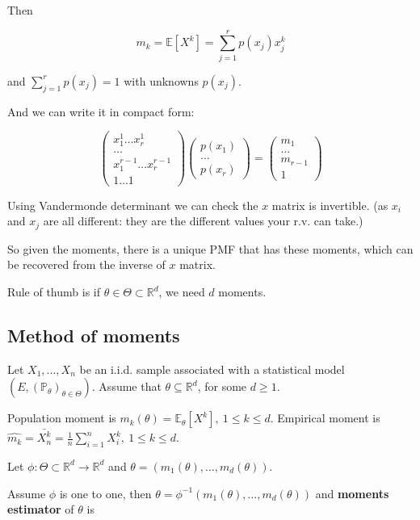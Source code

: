 \documentclass{article}
\begin{document}
Then

$$
m_k = \mathbb{E}[X^k] = \sum_{j = 1}^{r} {p(x_j) x_j^k}
$$

and $\sum_{j = 1}^{r} p(x_j) = 1$ with unknowns $p(x_j)$.

And we can write it in compact form:

$$
\begin{pmatrix}
x_1^1 \dots x_r^1 \\
\dots \\
x_1^{r-1} \dots x_r^{r-1} \\
1 \dots 1
\end{pmatrix}
\begin{pmatrix}
  p(x_1) \\
  \dots  \\
  p(x_r)
\end{pmatrix} = 
\begin{pmatrix}
  m_1 \\
  \dots  \\
  m_{r - 1} \\
  1
\end{pmatrix}
$$

Using Vandermonde determinant we can check the $x$ matrix is invertible. (as $x_i$ and $x_j$ are all different: they are the different values your r.v. can take.)

So given the moments, there is a unique PMF that has these moments, which can be recovered from the inverse of $x$ matrix.

Rule of thumb is if $\theta \in \Theta \subset \mathbb{R}^d$, we need $d$ moments.

\subsection{Method of moments}

Let $X_1, ... , X_n$ be an i.i.d. sample associated with a statistical model $(E, (\mathbb{P}_{\theta})_{\theta \in \Theta})$.
Assume that $\theta \subseteq \mathbb{R}^d$, for some $d \geq 1$.

Population moment is $m_k(\theta) = \mathbb{E}_{\theta}[X^k], ~ 1 \leq k \leq d$.
Empirical moment is $\hat{m_k} = \bar{X^k_n} = \frac{1}{n} \sum_{i=1}^{n} X_i^k, ~ 1 \leq k \leq d$.

Let $\phi : \Theta \subset \mathbb{R}^d \to \mathbb{R}^d$ and $\theta = (m_1(\theta), \dots, m_d(\theta))$.

Assume $\phi$ is one to one, then $\theta = \phi^{-1} (m_1(\theta), \dots, m_d(\theta))$ and \textbf{moments estimator} of $\theta$ is
\end{document}
